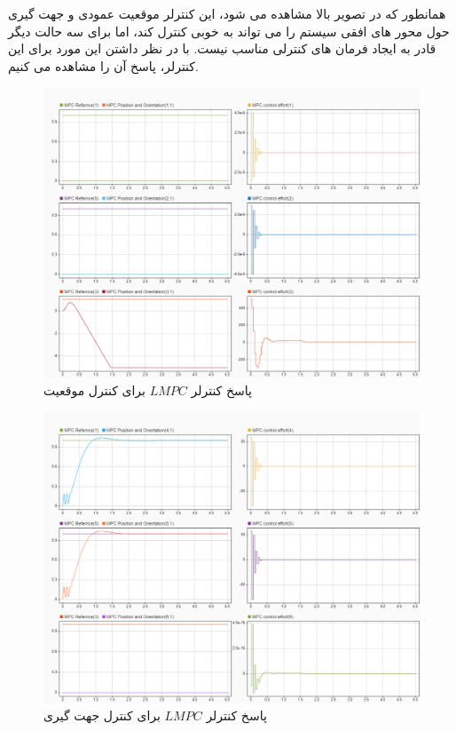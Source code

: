 همانطور که در تصویر بالا مشاهده می شود، این کنترلر موقعیت عمودی و جهت گیری حول محور های افقی سیستم را می تواند به خوبی کنترل کند، اما برای سه حالت دیگر قادر به ایجاد فرمان های کنترلی مناسب نیست. 
با در نظر داشتن این مورد برای این کنترلر، پاسخ آن را مشاهده می کنیم.
\begin{figure}[H]
	\centering
	\includegraphics[width=1\linewidth]{../img/LMPC_Response_Position}
	\caption{پاسخ کنترلر $LMPC$ برای کنترل موقعیت}
	\label{fig:lmpcresponseposition}
\end{figure}
\begin{figure}[H]
	\centering
	\includegraphics[width=1\linewidth]{../img/LMPC_Response_Orientation}
	\caption{پاسخ کنترلر $LMPC$ برای کنترل جهت گیری}
	\label{fig:lmpcresponseorientation}
\end{figure}

